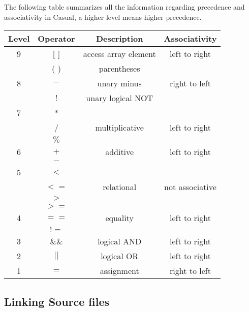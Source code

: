 \documentclass[12pt]{article}
\begin{document}
The following table summarizes all the information regarding precedence and associativity in Casual, a higher level means higher precedence.

\begin{table}[htb]
\centering
\begin{tabular}{| c | c | c | c |} 
 \hline
Level & Operator & Description & Associativity        \\ \hline
 9    & [ ]      & access array element & left to right \\ 
      & ( )      & parentheses          &  \\ \hline\hline
          
 8    & $- $     & unary minus          & right to left \\ 
      & $!$      & unary logical NOT    & \\ \hline\hline
      
 7    & $*$      &                      & \\ 
      & /        & multiplicative       & left to right \\
      & $\%$     &                      & \\ \hline\hline
      
 6    & $+$      & additive             & left to right\\
      & $-$      &                      & \\  \hline\hline
 
 5    & $< $     &                      & \\
      & $<=$     & relational           & not associative\\
      & $> $     &                      & \\
      & $>=$     &                      &  \\  \hline\hline 
      
 4    & $==$     & equality             & left to right\\
      & $!=$     &                      & \\ \hline\hline
      
 3    & $\&\&$   & logical AND          & left to right\\   \hline\hline
 
 2    & $||$     & logical OR           & left to right\\   \hline\hline
 
 1    & $=$      & assignment           & right to left \\   \hline
 
\end{tabular}
\end{table}

\newpage

\subsection{Linking Source files}


\end{document}
